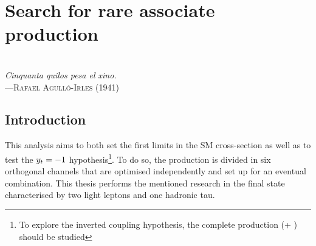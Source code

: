 \begin{comment}
%
%
asdf
\end{comment}

\chapter{Search for rare associate \tHq production}
\label{chap:Analysis_tH}
\vspace*{0.1 cm} 
\hspace*{200pt} \\
\hspace*{120pt} \textit{Cinquanta quilos pesa el xino.} \\
\hspace*{140pt} ---\textsc{Rafael Agulló-Irles (1941)} \\%
\vspace*{2cm} 




\section{Introduction}
\label{sec:ChaptH:Intro}

This analysis aims to both set the first limits in the \tHq%
SM cross-section as well as to test the $y_{t} = -1$ hypothesis\footnote{To explore 
the inverted coupling hypothesis, the complete \tH production (\tHq + \tWH) should be studied}. 
To do so, 
the \tHq production is divided in six orthogonal channels that are optimised
independently and set up for an eventual combination. This thesis performs
the mentioned research in the final state characterised by two light leptons
and one hadronic tau.

